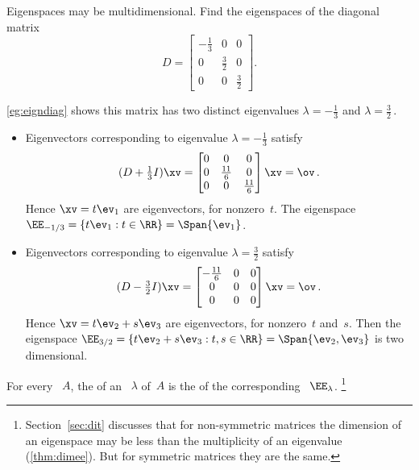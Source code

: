 \begin{example} \label{eg:espace2d}
Eigenspaces may be multidimensional.  
Find the eigenspaces of the diagonal matrix
\begin{equation*}
D=\begin{bmatrix} -\frac13&0&0\\0&\frac32&0\\0&0&\frac32 \end{bmatrix}.
\end{equation*}
\begin{solution} 
\autoref{eg:eigndiag} shows this matrix has two distinct eigenvalues \(\lambda=-\frac13\) and \(\lambda=\frac32\)\,.
\begin{itemize}
\item Eigenvectors corresponding to eigenvalue \(\lambda=-\frac13\) satisfy
\begin{equation*}
(D+\tfrac13I)\xv=\begin{bmatrix} 0&0&0\\0&\frac{11}6&0\\0&0&\frac{11}6 \end{bmatrix}\xv=\ov\,.
\end{equation*}
Hence \(\xv=t\ev_1\) are eigenvectors, for nonzero~\(t\).
The eigenspace \(\EE_{-1/3}=\{t\ev_1 : t\in\RR\}=\Span\{\ev_1\}\).

\item Eigenvectors corresponding to eigenvalue \(\lambda=\frac32\) satisfy
\begin{equation*}
(D-\tfrac32I)\xv=\begin{bmatrix} -\frac{11}6&0&0\\0&0&0\\0&0&0 \end{bmatrix}\xv=\ov\,.
\end{equation*}
Hence \(\xv=t\ev_2+s\ev_3\) are eigenvectors, for nonzero~\(t\) and~\(s\).
Then the eigenspace \(\EE_{3/2}=\{t\ev_2+s\ev_3 : t,s\in\RR\}=\Span\{\ev_2,\ev_3\}\) is two dimensional.

\end{itemize}
\end{solution}
\end{example}




\begin{definition} \label{def:eigsymult}
For every ~\(A\), the  of an ~\(\lambda\) of~\(A\) is the  of the corresponding ~\(\EE_\lambda\).%
\footnote{Section~\ref{sec:dit} discusses that for non-symmetric matrices the dimension of an eigenspace may be less than the multiplicity of an eigenvalue (\autoref{thm:dimee}). 
But for symmetric matrices they are the same.}
\end{definition}



